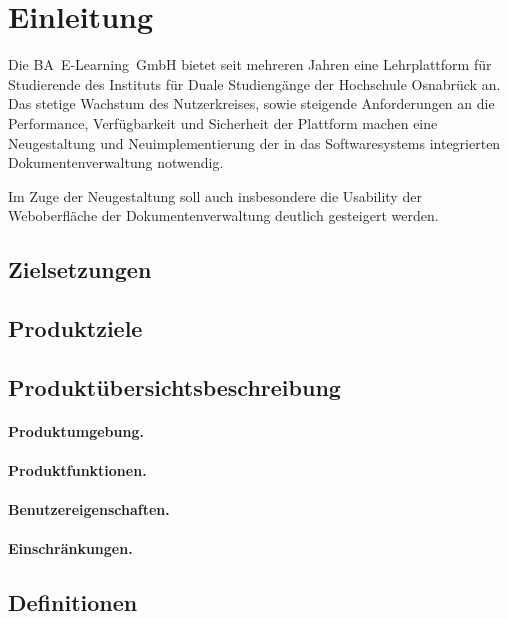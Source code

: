 \section{Einleitung}


Die BA~E-Learning~GmbH bietet seit mehreren Jahren eine Lehrplattform für 
Studierende des Instituts für Duale Studiengänge der Hochschule Osnabrück
an. Das stetige Wachstum des Nutzerkreises, sowie steigende Anforderungen 
an die Performance, Verfügbarkeit und Sicherheit der Plattform machen eine
Neugestaltung und Neuimplementierung der in das Softwaresystems integrierten 
Dokumentenverwaltung notwendig.

Im Zuge der Neugestaltung soll auch insbesondere die Usability der Weboberfläche
der Dokumentenverwaltung deutlich gesteigert werden. 

\subsection{Zielsetzungen}



\subsection{Produktziele}



\subsection{Produktübersichtsbeschreibung}

\paragraph{Produktumgebung.}

\paragraph{Produktfunktionen.}

\paragraph{Benutzereigenschaften.}

\paragraph{Einschränkungen.}

\subsection{Definitionen}
